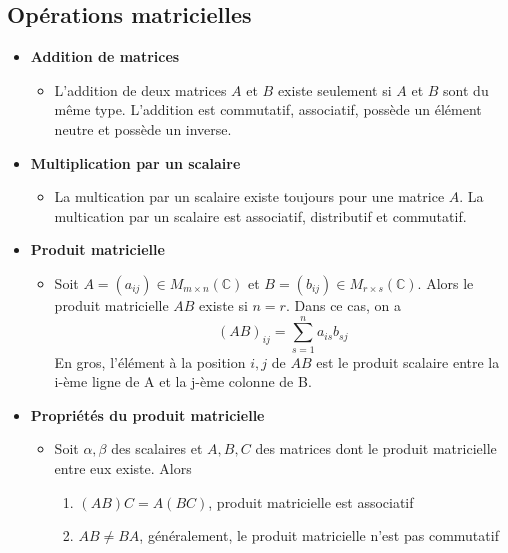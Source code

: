 \subsection*{Opérations matricielles}
\begin{itemize}
    \item[] \textbf{Addition de matrices} \begin{itemize}
              \item[] L'addition de deux matrices $A$ et $B$ existe seulement si $A$ et $B$ sont du même type.
                    L'addition est commutatif, associatif, possède un élément neutre et possède un inverse.
          \end{itemize}
    \item[] \textbf{Multiplication par un scalaire} \begin{itemize}
              \item[] La multication par un scalaire existe toujours pour une matrice $A$. La multication
                    par un scalaire est associatif, distributif et commutatif.
          \end{itemize}
    \item[] \textbf{Produit matricielle} \begin{itemize}
              \item[] Soit $A = (a_{ij}) \in M_{m \times n}(\mathbb{C})$ et $B = (b_{ij}) \in M_{r \times s}(\mathbb{C})$. Alors
                    le produit matricielle $AB$ existe si $n = r$. Dans ce cas, on a \begin{equation*}
                        (AB)_{ij} = \sum_{s = 1}^{n} a_{is} b_{sj}
                    \end{equation*}
                    En gros, l'élément à la position $i, j$ de $AB$ est le produit scalaire entre la i-ème ligne
                    de A et la j-ème colonne de B.
          \end{itemize}
    \item[] \textbf{Propriétés du produit matricielle} \begin{itemize}
              \item[] Soit $\alpha, \beta$ des scalaires et $A, B, C$ des matrices dont le produit matricielle entre eux existe. Alors \begin{enumerate}
                        \item $(AB)C = A(BC)$, produit matricielle est associatif
                        \item $AB \neq BA$, généralement, le produit matricielle n'est pas commutatif

\end{enumerate}
\end{itemize}
\end{itemize}
